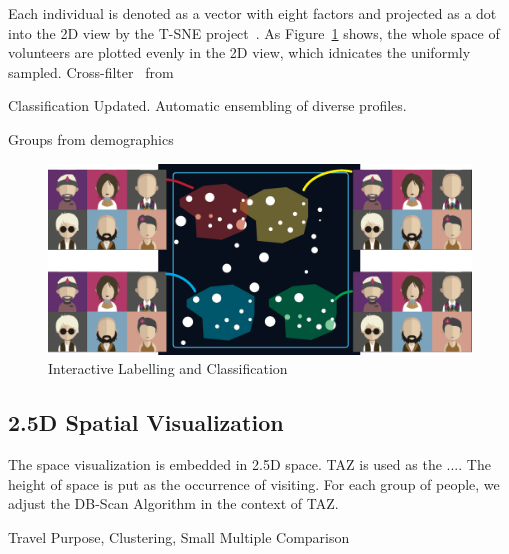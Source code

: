 Each individual is denoted as a vector with eight factors and projected as a dot into the 2D view by the T-SNE project~\cite{}. As 
Figure~\ref{fig:mds} shows, the whole space of volunteers are plotted evenly in the 2D view, which idnicates the uniformly sampled. Cross-filter~\cite{} from 

Classification Updated. Automatic ensembling of diverse profiles. 

Groups from demographics

\begin{figure}[htb!]
 \centering %
 \includegraphics[width=\columnwidth]{pictures/mds}
 \caption{Interactive Labelling and Classification}
 \label{fig:mds}
\end{figure}

\subsection{2.5D Spatial Visualization}

The space visualization is embedded in 2.5D space. TAZ is used as the .... The height of space is put as the occurrence of visiting. For each group of people, we adjust the DB-Scan Algorithm in the context of TAZ. 

Travel Purpose, Clustering, Small Multiple Comparison